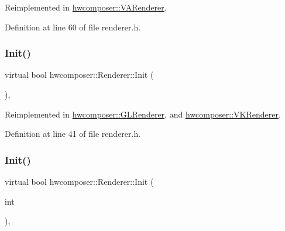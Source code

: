 Reimplemented in \mbox{\hyperlink{classhwcomposer_1_1VARenderer_a5fdcb230093416433e8cf394137b9cc1}{hwcomposer\+::\+V\+A\+Renderer}}.



Definition at line 60 of file renderer.\+h.


\begin{DoxyCode}{0}
\end{DoxyCode}
\mbox{\label{classhwcomposer_1_1Renderer_aa7f5e7d36857fb67093b9f0cc3a7e606}} 
\subsubsection{\texorpdfstring{Init()}{Init()}\hspace{0.1cm}{\footnotesize\ttfamily [1/2]}}
{\footnotesize\ttfamily virtual bool hwcomposer\+::\+Renderer\+::\+Init (\begin{DoxyParamCaption}{ }\end{DoxyParamCaption})\hspace{0.3cm}{\ttfamily [inline]}, {\ttfamily [virtual]}}



Reimplemented in \mbox{\hyperlink{classhwcomposer_1_1GLRenderer_a13460f969b8fd85b74ae1fecadff744e}{hwcomposer\+::\+G\+L\+Renderer}}, and \mbox{\hyperlink{classhwcomposer_1_1VKRenderer_aa5ec08a716d38af3c59827b05045e56f}{hwcomposer\+::\+V\+K\+Renderer}}.



Definition at line 41 of file renderer.\+h.


\begin{DoxyCode}{0}
\end{DoxyCode}
\mbox{\label{classhwcomposer_1_1Renderer_a23d289f318b33cdcf998475c2a36aeb2}} 
\subsubsection{\texorpdfstring{Init()}{Init()}\hspace{0.1cm}{\footnotesize\ttfamily [2/2]}}
{\footnotesize\ttfamily virtual bool hwcomposer\+::\+Renderer\+::\+Init (\begin{DoxyParamCaption}\item[{int}]{ }\end{DoxyParamCaption})\hspace{0.3cm}{\ttfamily [inline]}, {\ttfamily [virtual]}}




